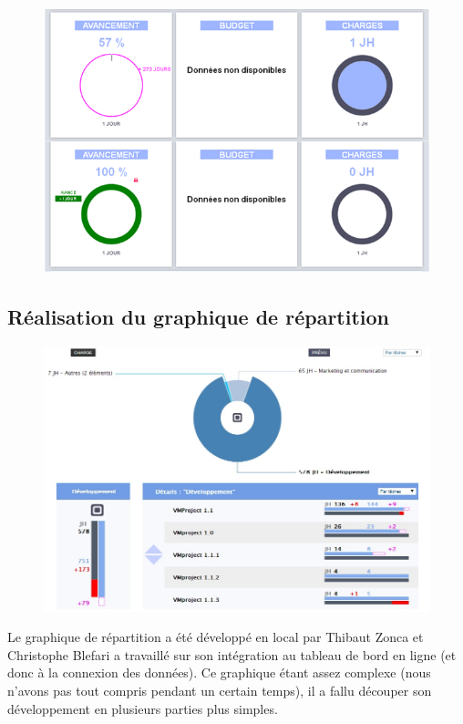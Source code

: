 \documentclass[12pt]{report}
\begin{document}
		\begin{figure}[H]
	\centering
	\includegraphics[width=1\textwidth]{pictures/clement/c9.png}
	\caption{}
	\label{c9}
\end{figure}

	\subsection{Réalisation du graphique de répartition}

\begin{figure}[H]
	\centering
	\includegraphics[width=1\textwidth]{pictures/realisations/repartition.jpg}
	\caption{}
	\label{17}
\end{figure}

Le graphique de répartition a été développé en local par Thibaut Zonca et Christophe Blefari a travaillé sur son intégration au tableau de bord en ligne (et donc à la connexion des données). Ce graphique étant assez complexe (nous n'avons pas tout compris pendant un certain temps), il a fallu découper son développement en plusieurs parties plus simples. \\
\end{document}
